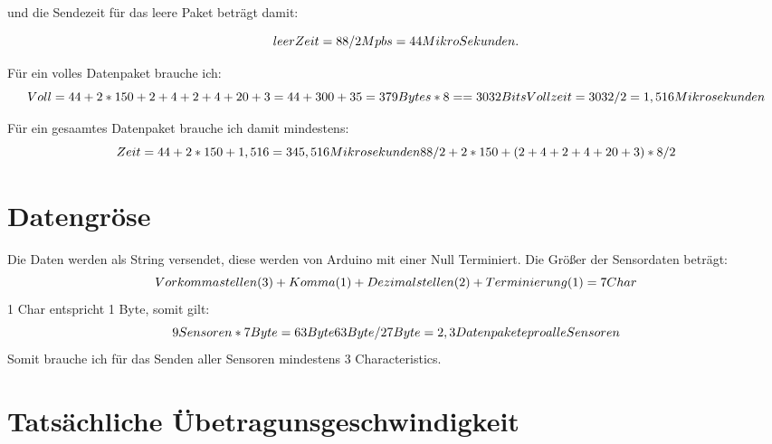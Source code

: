 und die Sendezeit für das leere Paket beträgt damit:

\begin{equation}
    $$
leerZeit = 88/2Mpbs = 44 Mikro Sekunden.
$$
\end{equation}


Für ein volles Datenpaket brauche ich:
\begin{equation}
    $$
Voll = 44 + 2*150+ 2+4+2+4+20+3 = 44+300+35 = 379Bytes *8 ==3032 Bits
Vollzeit = 3032 / 2 = 1,516 Mikrosekunden
$$
\end{equation}

Für ein gesaamtes Datenpaket brauche ich damit mindestens:
\begin{equation}
    $$
Zeit = 44 + 2*150 + 1,516 = 345,516 Mikrosekunden
88/2 + 2*150 + (2 + 4 + 2 + 4 + 20 + 3)*8/2
$$
\end{equation}

\section{Datengröse}
Die Daten werden als String versendet, diese werden von Arduino mit einer
Null Terminiert. Die Größer der Sensordaten beträgt:
\begin{equation}
    $$
Vorkommastellen (3) + Komma (1) + Dezimalstellen (2) + Terminierung (1) = 7 Char
$$
\end{equation}
1 Char entspricht 1 Byte, somit gilt:
\begin{equation}$$
9 Sensoren * 7 Byte = 63 Byte
63 Byte / 27 Byte = 2,3 Datenpakete pro alle Sensoren
$$
\end{equation}
Somit brauche ich für das Senden aller Sensoren mindestens 3 Characteristics.

\section{Tatsächliche Übetragunsgeschwindigkeit}
